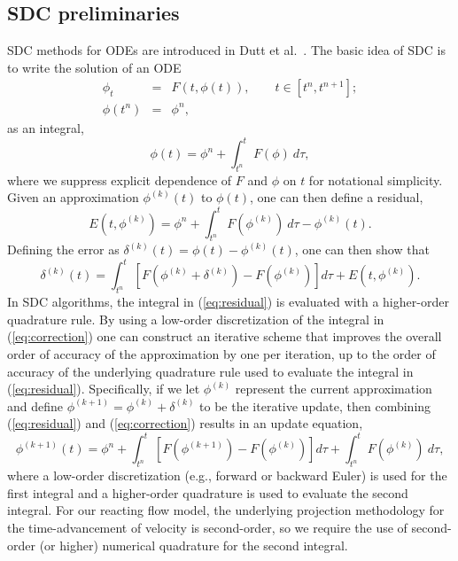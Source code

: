 \subsection{SDC preliminaries}
\label{AlgoDetails}
SDC methods for ODEs are introduced in Dutt et al.~\cite{Dutt:2000}.
The basic idea of SDC is to write the solution of an ODE
\begin{eqnarray}
\phi_t &=& F(t,\phi(t)), \qquad t\in[t^n,t^{n+1}];\\
\phi(t^n) &=& \phi^n,
\end{eqnarray}
as an integral,
\begin{equation}
\phi(t) = \phi^n + \int_{t^n}^{t} F(\phi)~d\tau,
\end{equation}
where we suppress explicit dependence of $F$ and $\phi$ on $t$ for notational simplicity.
Given an approximation $\phi^{(k)}(t)$ to $\phi(t)$, one can then define a residual,
\begin{equation}
E(t,\phi^{(k)}) = \phi^n + \int_{t^n}^t F(\phi^{(k)})~d\tau - \phi^{(k)}(t).\label{eq:residual}
\end{equation}
Defining the error as $\delta^{(k)}(t) = \phi(t) - \phi^{(k)}(t)$, one can then show that
\begin{equation}
\delta^{(k)}(t) = \int_{t^n}^t \left[F(\phi^{(k)}+ \delta^{(k)}) - F(\phi^{(k)})\right]d\tau + E(t,\phi^{(k)}).\label{eq:correction}
\end{equation}
In SDC algorithms, the integral in (\ref{eq:residual}) 
is evaluated with a higher-order quadrature rule.
By using a low-order discretization of the integral in (\ref{eq:correction}) one can construct
an iterative scheme that improves the overall order of accuracy of the approximation by one per
iteration, up to the order of accuracy of the underlying quadrature rule 
used to evaluate the integral in (\ref{eq:residual}).
Specifically, if we let $\phi^{(k)}$ represent the current approximation and define 
$\phi^{(k+1)} = \phi^{(k)} + \delta^{(k)}$ to be the iterative update, 
then combining (\ref{eq:residual}) and (\ref{eq:correction}) results in an update equation,
\begin{equation}
\phi^{(k+1)}(t) = \phi^n + \int_{t^n}^t \left[F(\phi^{(k+1)}) - F(\phi^{(k)})\right]d\tau +
 \int_{t^n}^t F(\phi^{(k)})~d\tau,\label{eq:update}
\end{equation}
where a low-order discretization (e.g., forward or backward Euler) is used for the first integral 
and a higher-order quadrature is used to evaluate the second integral.  For our reacting flow model,
the underlying projection methodology for the time-advancement of velocity is second-order,
so we require the use of second-order (or higher) numerical quadrature for the second integral.


